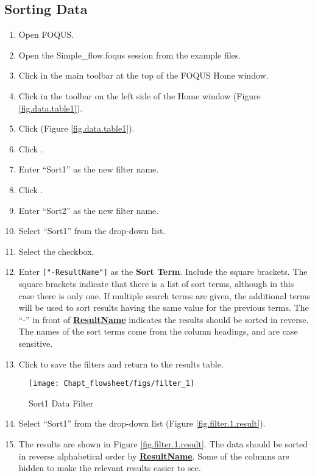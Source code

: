 \subsection{Sorting Data}

\begin{enumerate}
	\item Open FOQUS.
	\item Open the Simple\_flow.foqus session from the example files.
	\item Click  in the main toolbar at the top of the FOQUS Home window.
	\item Click  in the toolbar on the left side of the Home window (Figure \ref{fig.data.table1}).
	\item Click  (Figure \ref{fig.data.table1}).
	\item Click .
	\item Enter ``Sort1'' as the new filter name.
	\item Click .
	\item Enter ``Sort2'' as the new filter name.
	\item Select ``Sort1'' from the  drop-down list.
	\item Select the  checkbox.
	\item Enter \verb|["-ResultName"]| as the \textbf{Sort Term\underline{}}. Include the square brackets. The square brackets indicate that there is a list of sort terms, although in this case there is only one. If multiple search terms are given, the additional terms will be used to sort results having the same value for the previous terms. The ``-'' in front of \textbf{\underline{ResultName}} indicates the results should be sorted in reverse.  The names of the sort terms come from the column headings, and are case sensitive.
	\item Click  to save the filters and return to the results table.
\end{enumerate}

\begin{figure}[H]
	\begin{center}
		\texttt{[image: Chapt\_flowsheet/figs/filter\_1]}
		\caption{Sort1 Data Filter}
		\label{fig.filter.1}
	\end{center}
\end{figure}

\begin{enumerate}
	\setcounter{enumi}{13}
	\item Select ``Sort1'' from the  drop-down list (Figure \ref{fig.filter.1.result}).
	\item The results are shown in Figure \ref{fig.filter.1.result}. The data should be sorted in reverse alphabetical order by \textbf{\underline{ResultName}}. Some of the columns are hidden to make the relevant results easier to see.
\end{enumerate}


